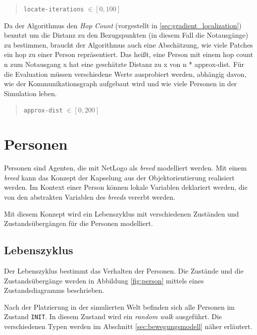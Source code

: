 \begin{quote}
\verb|locate-iterations| $\in [0, 100]$
\end{quote}

Da der Algorithmus den \emph{Hop Count} (vorgestellt in \ref{sec:gradient_localization}) benutzt um die Distanz zu den Bezugspunkten (in diesem Fall die Notausgänge) zu bestimmen, braucht der Algorithmus auch eine Abschätzung, wie viele Patches ein hop zu einer Person repräsentiert. Das heißt, eine Person mit einem hop count n zum Notausgang x hat eine geschätzte Distanz zu x von n * approx-dist. Für die Evaluation müssen verschiedene Werte ausprobiert werden, abhängig davon, wie der Kommunikationsgraph aufgebaut wird und wie viele Personen in der Simulation leben.

\begin{quote}
\verb|approx-dist| $\in [0, 200]$
\end{quote}






\section{Personen}
\label{sec:personen}

Personen sind Agenten, die mit NetLogo als \emph{breed} modelliert werden. Mit einem \emph{breed} kann das Konzept der Kapselung aus der Objektorientierung realisiert werden. Im Kontext einer Person können lokale Variablen deklariert werden, die von den abstrakten Variablen des \emph{breeds} vererbt werden. 

Mit diesem Konzept wird ein Lebenszyklus mit verschiedenen Zuständen und Zustandsübergängen für die Personen modelliert. 

\subsection{Lebenszyklus}

Der Lebenszyklus bestimmt das Verhalten der Personen. Die Zustände und die Zustandsübergänge werden in Abbildung \ref{fig:person} mittels eines Zustandsdiagramms beschrieben. 

Nach der Platzierung in der simulierten Welt befinden sich alle Personen im Zustand \verb|INIT|. In diesem Zustand wird ein \emph{random walk} ausgeführt. Die verschiedenen Typen werden im Abschnitt \ref{sec:bewegungsmodell} näher erläutert.

